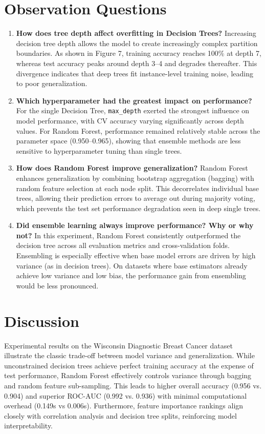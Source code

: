 \documentclass[12pt,a4paper]{article}
\begin{document}
\section{Observation Questions}
\begin{enumerate}
\item \textbf{How does tree depth affect overfitting in Decision Trees?} Increasing decision tree depth allows the model to create increasingly complex partition boundaries. As shown in Figure 7, training accuracy reaches 100\% at depth 7, whereas test accuracy peaks around depth 3--4 and degrades thereafter. This divergence indicates that deep trees fit instance-level training noise, leading to poor generalization.
\item \textbf{Which hyperparameter had the greatest impact on performance?} For the single Decision Tree, \texttt{max\_depth} exerted the strongest influence on model performance, with CV accuracy varying significantly across depth values. For Random Forest, performance remained relatively stable across the parameter space (0.950--0.965), showing that ensemble methods are less sensitive to hyperparameter tuning than single trees.
\item \textbf{How does Random Forest improve generalization?} Random Forest enhances generalization by combining bootstrap aggregation (bagging) with random feature selection at each node split. This decorrelates individual base trees, allowing their prediction errors to average out during majority voting, which prevents the test set performance degradation seen in deep single trees.
\item \textbf{Did ensemble learning always improve performance? Why or why not?} In this experiment, Random Forest consistently outperformed the decision tree across all evaluation metrics and cross-validation folds. Ensembling is especially effective when base model errors are driven by high variance (as in decision trees). On datasets where base estimators already achieve low variance and low bias, the performance gain from ensembling would be less pronounced.
\end{enumerate}

\section{Discussion}
Experimental results on the Wisconsin Diagnostic Breast Cancer dataset illustrate the classic trade-off between model variance and generalization. While unconstrained decision trees achieve perfect training accuracy at the expense of test performance, Random Forest effectively controls variance through bagging and random feature sub-sampling. This leads to higher overall accuracy (0.956 vs. 0.904) and superior ROC-AUC (0.992 vs. 0.936) with minimal computational overhead (0.149s vs 0.006s). Furthermore, feature importance rankings align closely with correlation analysis and decision tree splits, reinforcing model interpretability.
\end{document}
